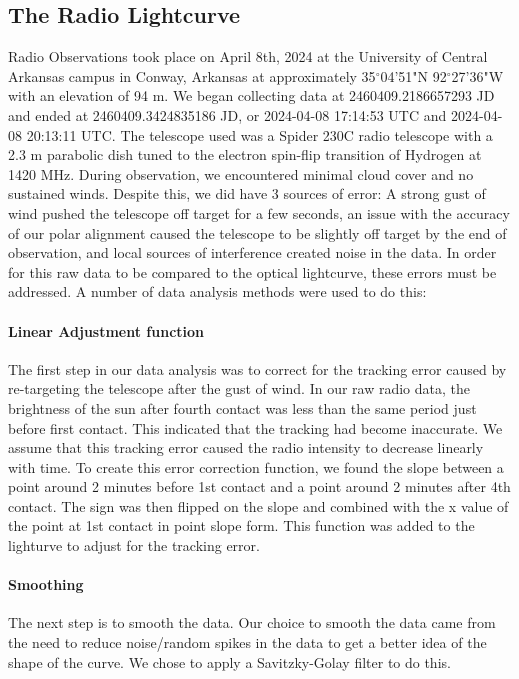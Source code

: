 \subsection{\label{sec:radio}The Radio Lightcurve}
Radio Observations took place on April 8th, 2024 at the University of Central Arkansas campus in Conway, Arkansas at approximately 35$^\circ$04'51"N 92$^\circ$27'36"W with an elevation of 94 m.
We began collecting data at 2460409.2186657293 JD and ended at 2460409.3424835186 JD, or 2024-04-08 17:14:53 UTC and 2024-04-08 20:13:11 UTC.
The telescope used was a Spider 230C radio telescope with a 2.3 m parabolic dish tuned to the electron spin-flip transition of Hydrogen at 1420 MHz.
During observation, we encountered minimal cloud cover and no sustained winds.
Despite this, we did have 3 sources of error: A strong gust of wind pushed the telescope off target for a few seconds, an issue with the accuracy of our polar alignment caused the telescope to be slightly off target by the end of observation, and local sources of interference created noise in the data.
In order for this raw data to be compared to the optical lightcurve, these errors must be addressed.
A number of data analysis methods were used to do this:
\paragraph{Linear Adjustment function}
The first step in our data analysis was to correct for the tracking error caused by re-targeting the telescope after the gust of wind.
In our raw radio data, the brightness of the sun after fourth contact was less than the same period just before first contact.
This indicated that the tracking had become inaccurate.
We assume that this tracking error caused the radio intensity to decrease linearly with time.
To create this error correction function, we found the slope between a point around 2 minutes before 1st contact and a point around 2 minutes after 4th contact. 
The sign was then flipped on the slope and combined with the x value of the point at 1st contact in point slope form.
This function was added to the lighturve to adjust for the tracking error.
\paragraph{Smoothing}
The next step is to smooth the data.
Our choice to smooth the data came from the need to reduce noise/random spikes in the data to get a better idea of the shape of the curve.
We chose to apply a Savitzky-Golay filter \cite{savitzky_golay_1964} to do this.


